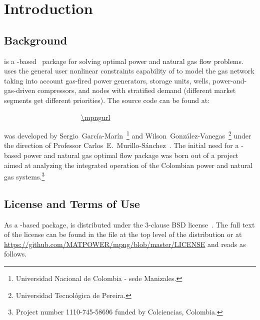 \normalsize
{}
\setcounter{page}{1}

\chapter{Introduction}
\label{chap:intro}

\section{Background}
\label{sec:background}

\mpng{} is a \matpower{}-based~\cite{zimmerman2011,matpower} package for solving optimal power and natural gas flow problems. \mpng{} uses the general user nonlinear constraints capability of \matpower{} to model the gas network taking into account gas-fired power generators, storage units, wells, power-and-gas-driven compressors, and nodes with stratified demand (different market segments get different priorities). The \mpng{} source code can be found at:

\bigskip
~~~~~~~~~~~~~~~~~~~~~~\url{\mpngurl}
\bigskip

\noindent \mpng{} was developed by Sergio~García-Marín~\footnote[1]{ Universidad Nacional de Colombia - sede Manizales.\label{foot:UNAL}} and Wilson~González-Vanegas~\footnote[2]{ Universidad Tecnológica de Pereira.\label{foot:UTP}} under the direction of Professor Carlos~E.~Murillo-S\'anchez~. The initial need for a \matpower{}-based power and natural gas optimal flow package was born out of a project aimed at analyzing the integrated operation of the Colombian power and natural gas systems.\footnote[3]{ Project number 1110-745-58696 funded by Colciencias, Colombia.}

\section{License and Terms of Use}
\label{sec:license}

As a \matpower{}-based package, \mpng{} is distributed under the 3-clause BSD license~\cite{bsd}. The full text of the license can be found in the  file at the top level of the distribution or at \url{https://github.com/MATPOWER/mpng/blob/master/LICENSE} and reads as follows. 

